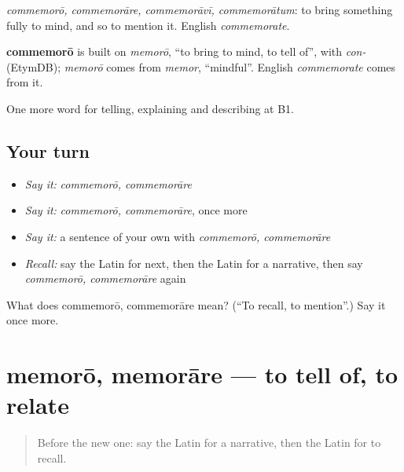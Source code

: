 \emph{commemorō, commemorāre, commemorāvī, commemorātum}: to bring something fully to mind, and so to mention it. English \emph{commemorate}.

\begin{cousinweb}
\textbf{commemorō} is built on \emph{memorō}, \textquotedblleft{}to bring to mind, to tell of\textquotedblright{}, with \emph{con-} (EtymDB); \emph{memorō} comes from \emph{memor}, \textquotedblleft{}mindful\textquotedblright{}. English \emph{commemorate} comes from it.
\end{cousinweb}

\begin{grammarlens}[title={What you've built}]
One more word for telling, explaining and describing at B1.
\end{grammarlens}

\subsection*{Your turn}
\begin{itemize}
\raggedright
  \item \emph{Say it:} \emph{commemorō, commemorāre}
  \item \emph{Say it:} \emph{commemorō, commemorāre}, once more
  \item \emph{Say it:} a sentence of your own with \emph{commemorō, commemorāre}
  \item \emph{Recall:} say the Latin for next, then the Latin for a narrative, then say \emph{commemorō, commemorāre} again
\end{itemize}

\begin{tcolorbox}[breakable,colback=teal!4,colframe=teal!35!black,title={Before you move on}]
What does commemorō, commemorāre mean? (\textquotedblleft{}To recall, to mention\textquotedblright{}.) Say it once more.
\end{tcolorbox}
\section[memorō, memorāre]{memorō, memorāre — to tell of, to relate}

\label{lesson:LA-C299-memoro}



\begin{quote}
Before the new one: say the Latin for a narrative, then the Latin for to recall.
\end{quote}

